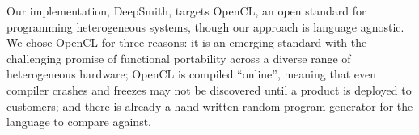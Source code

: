 Our implementation, DeepSmith, targets OpenCL, an open standard for programming heterogeneous systems, though our approach is language agnostic. We chose OpenCL for three reasons: it is an emerging standard with the challenging promise of functional portability across a diverse range of heterogeneous hardware; OpenCL is compiled ``online'', meaning that even compiler crashes and freezes may not be discovered until a product is deployed to customers; and there is already a hand written random program generator for the language to compare against.


